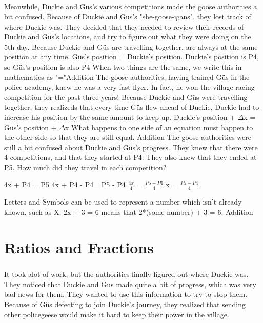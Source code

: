 \documentclass[a4paper,11pt ]{book}
\begin{document}
\paragraph{} Meanwhile, Duckie and Güs's various competitions made the goose authorities a bit confused. Because of Duckie and Gus's "she-goose-igans", they lost track of where Duckie was. They decided that they needed to review their records of Duckie and Güs's locations, and try to figure out what they were doing on the 5th day. 
{Because Duckie and Güs are travelling together, are always at the same position at any time.}
{Güs's position = Duckie's position. Duckie's position is P4, so Güs's position is also P4}
{When two things are the same, we write this in mathematics as "="}{Addition}
{The goose authorities, having trained Güs in the police academy, knew he was a very fast flyer. In fact, he won the village racing competition for the past three years! Because Duckie and Güs were travelling together, they realizeds that every time Güs flew ahead of Duckie, Duckie had to increase his position by the same amount to keep up.}
{Duckie's position + $\Delta$x = Güs's position + $\Delta$x}
{What happens to one side of an equation must happen to the other side so that they are still equal.}
{Addition}
{The goose authorities were still a bit confused about Duckie and Güs's progress. They knew that there were 4 competitions, and that they started at P4. They also knew that they ended at P5. How much did they travel in each competition?}
{\begin{center} 4x + P4 = P5 \linebreak 4x + P4 - P4= P5 - P4 \linebreak $\frac{4x}{4}$ = $\frac{P5-P4}{4}$ \linebreak x = $\frac{P5-P4}{4}$  \end{center}}
{Letters and Symbols can be used to represent a number which isn’t already known, such as X. 2x + 3 = 6 means that 2*(some number) + 3 = 6.}
{Addition}
\chapter{Ratios and Fractions}
\paragraph{} It took alot of work, but the authorities finally figured out where Duckie was. They noticed that Duckie and Gus made quite a bit of progress, which was very bad news for them. They wanted to use this information to try to stop them. Because of Güs defecting to join Duckie's journey, they realized that sending other policegeese would make it hard to keep their power in the village. 
\end{document}
